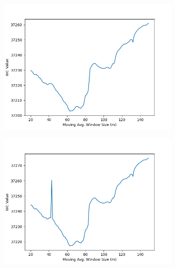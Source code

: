\documentclass[12pt]{article}
\begin{document}
\begin{figure}[!ht]
  \begin{subfigure}[!ht]{0.45\textwidth}
    \includegraphics[width=\linewidth]{Prop_Vol_Cr}
  \end{subfigure}\hfill
  \begin{subfigure}[!ht]{0.45\textwidth}
    \includegraphics[width=\linewidth]{Vol_Cr}
  \end{subfigure}

\end{figure}

\pagebreak
\end{document}
